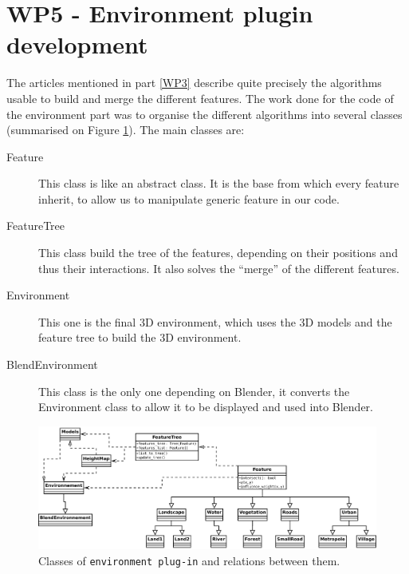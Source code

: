 \section{WP5 - Environment plugin development}

The articles mentioned in part \ref{WP3} describe quite precisely the algorithms usable to build and merge the different features. The work done for the code of the environment part was to organise the different algorithms into several classes (summarised on Figure \ref{env_classes}). The main classes are:

\begin{description}
  \item[Feature] This class is like an abstract class. It is the base from which every feature inherit, to allow us to manipulate generic feature in our code.
    \item[FeatureTree] This class build the tree of the features, depending on their positions and thus their interactions. It also solves the ``merge'' of the different features.
    \item[Environment] This one is the final 3D environment, which uses the 3D models and the feature tree to build the 3D environment.
    \item[BlendEnvironment] This class is the only one depending on Blender, it converts the Environment class to allow it to be displayed and used into Blender.
\end{description}

\begin{figure}[h]
  \includegraphics[width=15cm]{env_final.pdf}
  \caption{Classes of \texttt{environment plug-in} and relations between them.}
  \label{env_classes}
\end{figure}
